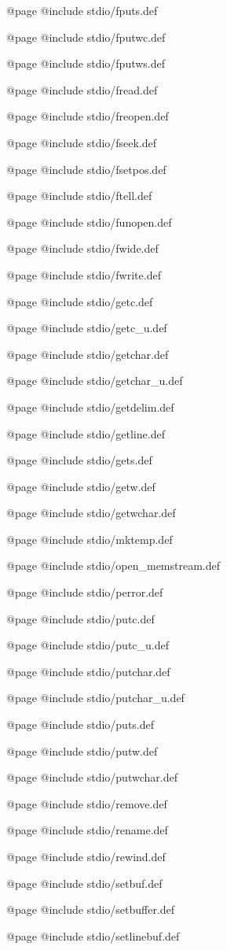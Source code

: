 @page
@include stdio/fputs.def

@page
@include stdio/fputwc.def

@page
@include stdio/fputws.def

@page
@include stdio/fread.def

@page
@include stdio/freopen.def

@page
@include stdio/fseek.def

@page
@include stdio/fsetpos.def

@page
@include stdio/ftell.def

@page
@include stdio/funopen.def

@page
@include stdio/fwide.def

@page
@include stdio/fwrite.def

@page
@include stdio/getc.def

@page
@include stdio/getc_u.def

@page
@include stdio/getchar.def

@page
@include stdio/getchar_u.def

@page
@include stdio/getdelim.def

@page
@include stdio/getline.def

@page
@include stdio/gets.def

@page
@include stdio/getw.def

@page
@include stdio/getwchar.def

@page
@include stdio/mktemp.def

@page
@include stdio/open_memstream.def

@page
@include stdio/perror.def

@page
@include stdio/putc.def

@page
@include stdio/putc_u.def

@page
@include stdio/putchar.def

@page
@include stdio/putchar_u.def

@page
@include stdio/puts.def

@page
@include stdio/putw.def

@page
@include stdio/putwchar.def

@page
@include stdio/remove.def

@page
@include stdio/rename.def

@page
@include stdio/rewind.def

@page
@include stdio/setbuf.def

@page
@include stdio/setbuffer.def

@page
@include stdio/setlinebuf.def

